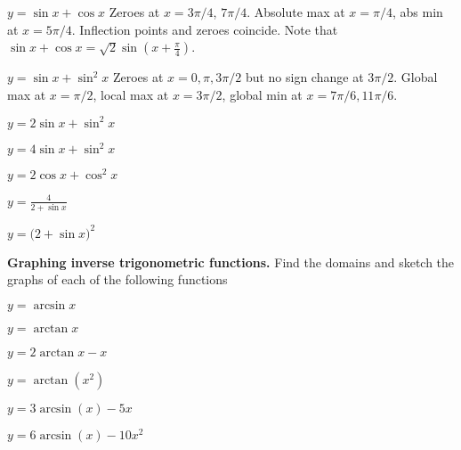 \begin{multicols}{2}
\problem $\displaystyle y=\sin x+\cos x$ %
\answer %
Zeroes at $x=3\pi/4$, $7\pi/4$. Absolute max at $x=\pi/4$, abs min at
$x=5\pi/4$.  Inflection points and zeroes coincide.  Note that
$\sin x+\cos x = \sqrt2 \sin(x+\frac\pi4)$.
\endanswer




\problem $\displaystyle y=\sin x +\sin^2 x$ %
\answer %
Zeroes at $x=0, \pi, 3\pi/2$ but no sign change at $3\pi/2$.  Global
max at $x=\pi/2$, local max at $x=3\pi/2$, global min at $x=7\pi/6,
11\pi/6$.
\endanswer




\problem $\displaystyle y=2\sin x+\sin^2x$ %




\problem $\displaystyle y=4\sin x +\sin^2 x$ %




\problem $\displaystyle y=2\cos x+\cos^2x$ %




\problem $\displaystyle y=\frac4{2+\sin x}$ %




\problem $\displaystyle y=\bigl(2+\sin x\bigr)^2$ %












\bigskip








\textbf{Graphing inverse trigonometric functions. }
Find the domains and sketch the graphs of each of the following functions




\problem $\displaystyle y=\arcsin x$ %




\problem $\displaystyle y=\arctan x$ %




\problem $\displaystyle y=2\arctan x-x$ %




\problem $\displaystyle y=\arctan(x^2)$ %




\problem $\displaystyle y=3\arcsin(x) - 5x $ %




\problem $\displaystyle y=6\arcsin (x) - 10x^2$ %













\end{multicols}
